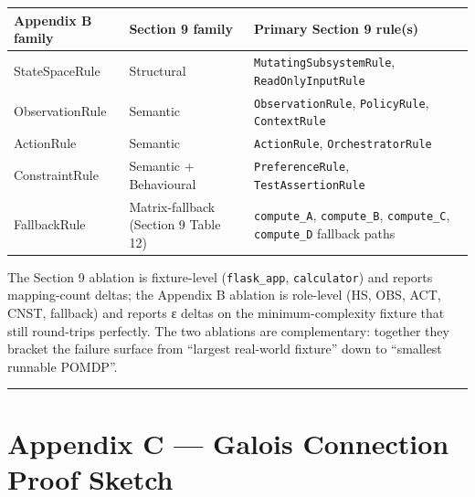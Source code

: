 \documentclass[
]{article}
\newcounter{none} %
\begin{document}
{\def\LTcaptype{none} %
\begin{longtable}[]{@{}
  >{\raggedright\arraybackslash}p{}
  >{\raggedright\arraybackslash}p{}
  >{\raggedright\arraybackslash}p{}@{}}
\toprule\noalign{}
\begin{minipage}[b]{\linewidth}\raggedright
Appendix B family
\end{minipage} & \begin{minipage}[b]{\linewidth}\raggedright
Section 9 family
\end{minipage} & \begin{minipage}[b]{\linewidth}\raggedright
Primary Section 9 rule(s)
\end{minipage} \\
\midrule\noalign{}
\endhead
\bottomrule\noalign{}
\endlastfoot
StateSpaceRule & Structural & \texttt{MutatingSubsystemRule},
\texttt{ReadOnlyInputRule} \\
ObservationRule & Semantic & \texttt{ObservationRule},
\texttt{PolicyRule}, \texttt{ContextRule} \\
ActionRule & Semantic & \texttt{ActionRule},
\texttt{OrchestratorRule} \\
ConstraintRule & Semantic + Behavioural & \texttt{PreferenceRule},
\texttt{TestAssertionRule} \\
FallbackRule & Matrix-fallback (Section 9 Table 12) &
\texttt{compute\_A}, \texttt{compute\_B}, \texttt{compute\_C},
\texttt{compute\_D} fallback paths \\
\end{longtable}
}

The Section 9 ablation is fixture-level (\texttt{flask\_app},
\texttt{calculator}) and reports mapping-count deltas; the Appendix B
ablation is role-level (HS, OBS, ACT, CNST, fallback) and reports ε
deltas on the minimum-complexity fixture that still round-trips
perfectly. The two ablations are complementary: together they bracket
the failure surface from ``largest real-world fixture'' down to
``smallest runnable POMDP''.

\begin{center}\rule{0.5\linewidth}{0.5pt}\end{center}

\newpage

\section{Appendix C --- Galois Connection Proof
Sketch}\label{appendix-c-galois-connection-proof-sketch}
\end{document}
